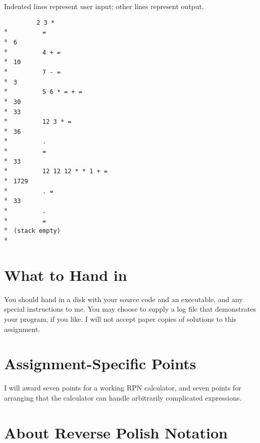 Indented lines represent user input; other lines represent output.
\begin{flushleft}
\verb!         2 3 * ! \\*
\verb!         =! \\*
\verb! 6! \\*
\verb!         4 + = ! \\*
\verb! 10 ! \\*
\verb!         7 - = ! \\*
\verb! 3 ! \\*
\verb!         5 6 * = + = ! \\*
\verb! 30! \\*
\verb! 33! \\*
\verb!         12 3 * = ! \\*
\verb! 36 ! \\*
\verb!         .! \\*
\verb!         =! \\*
\verb! 33 ! \\*
\verb!         12 12 12 * * 1 + = ! \\*
\verb! 1729 ! \\*
\verb!         . =  ! \\*
\verb! 33 ! \\*
\verb!         .! \\*
\verb!         =! \\*
\verb! (stack empty)! \\*
\end{flushleft}

\section{What to Hand in}

You should hand in a disk with your source code and an executable, and
any special instructions to me.  You may choose to supply a log file
that demonstrates your program, if you like.  I will not accept paper
copies of solutions to this assignment.

\section{Assignment-Specific Points}

    I will award seven points for a working RPN calculator, and seven
points for arranging that the calculator can handle arbitrarily
complicated expressions.

\section{About Reverse Polish Notation}
\label{rpn}

